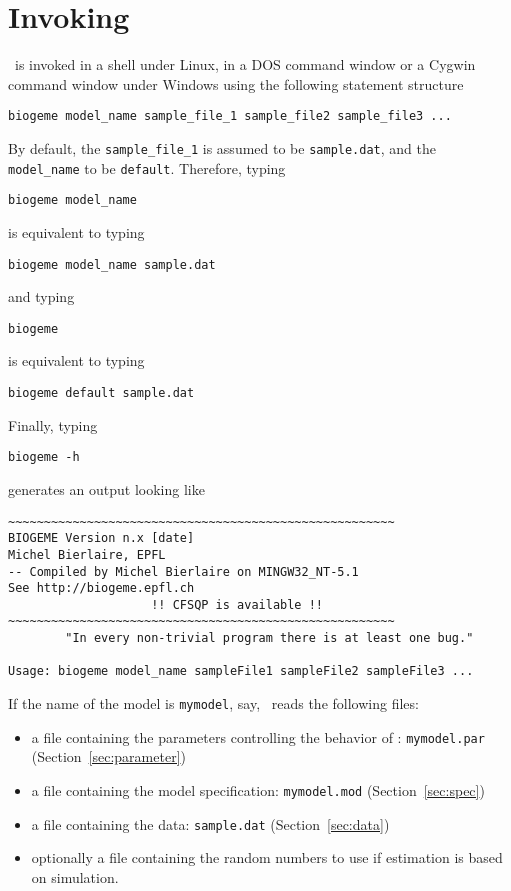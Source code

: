 \documentclass[12pt]{memoir}
\begin{document}
\section{Invoking \BIOGEME}

\BIOGEME\  is invoked in a shell under Linux, in a DOS command window or a Cygwin command window 
under Windows using the following statement structure

\begin{center}
\verb+biogeme model_name sample_file_1 sample_file2 sample_file3 ...+
\end{center}

By default, the \verb+sample_file_1+ is assumed to be \verb+sample.dat+, and the 
\verb+model_name+ to be \verb+default+. Therefore, typing
\begin{center}
\verb+biogeme model_name+
\end{center}
is equivalent to typing
\begin{center}
\verb+biogeme model_name sample.dat+
\end{center}
and typing
\begin{center}
\verb+biogeme+
\end{center}
is equivalent to typing
\begin{center}
\verb+biogeme default sample.dat+
\end{center}
Finally, typing
\begin{center}
\verb+biogeme -h+
\end{center}
generates an output looking like

{\footnotesize
\begin{verbatim}
~~~~~~~~~~~~~~~~~~~~~~~~~~~~~~~~~~~~~~~~~~~~~~~~~~~~~~
BIOGEME Version n.x [date]
Michel Bierlaire, EPFL
-- Compiled by Michel Bierlaire on MINGW32_NT-5.1
See http://biogeme.epfl.ch
                    !! CFSQP is available !!
~~~~~~~~~~~~~~~~~~~~~~~~~~~~~~~~~~~~~~~~~~~~~~~~~~~~~~
        "In every non-trivial program there is at least one bug."

Usage: biogeme model_name sampleFile1 sampleFile2 sampleFile3 ... 
\end{verbatim}
}

If the name of the model is \verb+mymodel+, say, \BIOGEME\ reads the following files:
\begin{itemize}
   \item a file containing the parameters controlling the behavior of \BIOGEME: \texttt{mymodel.par} (Section~\ref{sec:parameter})
   \item a file containing the model specification: \texttt{mymodel.mod}  (Section~\ref{sec:spec}) 
   \item a file containing the data: \texttt{sample.dat}  (Section~\ref{sec:data}) 
   \item optionally a file containing the random numbers to use if estimation is based on simulation.
\end{itemize}
\end{document}
